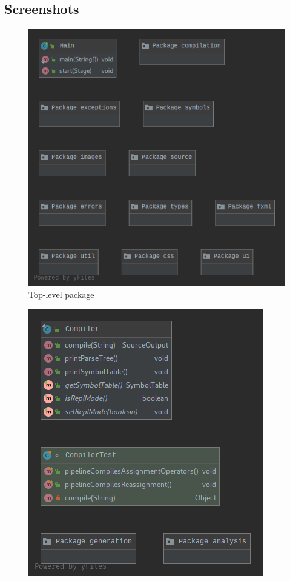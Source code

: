 \documentclass[
]{report}
\begin{document}
\begin{appendices}
	\chapter{Screenshots}
	\begin{figure}
		\centering
		\includegraphics[width=\textwidth]{top-package-diagram}
		\caption{Top-level package}
		\label{fig:top-package-diagram}
	\end{figure}
	\begin{figure}
		\centering
		\includegraphics[width=\textwidth]{compilation-package-diagram}

\end{figure}
\end{appendices}
\end{document}
